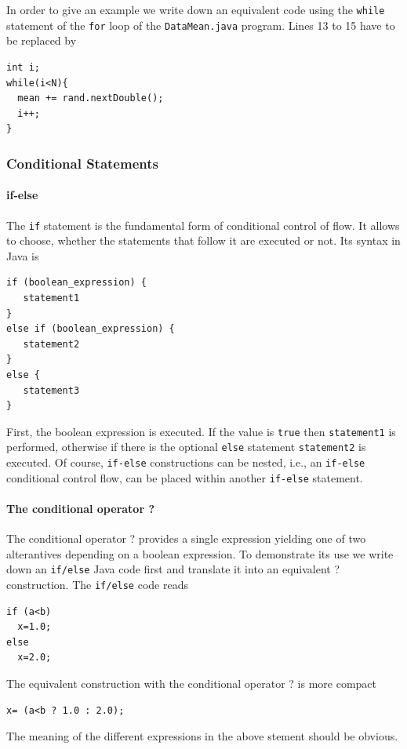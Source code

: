 In order to give an example we write down an equivalent code using
the
\verb|while| statement of the \verb|for| loop of the
\verb|DataMean.java| program. Lines 13 to 15 have to be replaced by
\begin{verbatim}
int i;
while(i<N){
  mean += rand.nextDouble();
  i++;
}
\end{verbatim}

\subsubsection{Conditional Statements}
\paragraph{if-else}
The \verb|if| statement is the fundamental form of conditional control
of flow. It allows to choose, whether the statements that follow it are
executed or not. Its syntax in Java is
\begin{verbatim}
if (boolean_expression) {
   statement1
}
else if (boolean_expression) {
   statement2
}
else {
   statement3
}
\end{verbatim}
First, the boolean expression is executed. If the value is \verb|true|
then \verb|statement1| is performed, otherwise if there is the
optional \verb|else| statement \verb|statement2| is executed. Of
course, \verb|if-else| constructions can be nested, i.e., an
\verb|if-else| conditional control flow, can be placed within another
\verb|if-else| statement.

\paragraph{The conditional operator ?} The conditional operator ?
provides a single expression yielding one of two alterantives depending on
a boolean expression. To demonstrate its use we write down an
\verb|if/else| Java code first and translate it into an equivalent  ? 
construction. The \verb|if/else| code reads

\begin{verbatim}
if (a<b) 
  x=1.0;
else
  x=2.0;
\end{verbatim}
The equivalent construction with the conditional operator ? is more
compact
\begin{verbatim}
x= (a<b ? 1.0 : 2.0);
\end{verbatim}
The meaning of the different expressions in the above stement should
be obvious.


